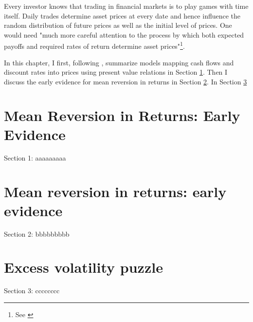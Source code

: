 \minitoc

\vspace{0.5cm}
Every investor knows that trading in financial markets is to play
games with time itself. Daily trades determine asset prices at every date and hence
influence the random distribution of future prices as well as the initial
level of prices. One would need "much more careful attention to the process
by which both expected payoffs and required rates of return determine
asset prices"\footnote{See \cite[p.~121]{campbell2017financial}}.

In this chapter, I first, following \citet[Chapter~5]{campbell2017financial}, summarize models 
mapping cash flows and discount rates into prices using present value relations in Section \ref{chap1:sec1}.
Then I discuss the early evidence for mean reversion in returns in Section \ref{chap1:sec2}.
In Section \ref{chap1:sec3}

\section{Mean Reversion in Returns: Early Evidence}\label{chap1:sec1}
Section 1: aaaaaaaaa

\section{Mean reversion in returns: early evidence}\label{chap1:sec2}
Section 2: bbbbbbbbb

\section{Excess volatility puzzle}\label{chap1:sec3}
Section 3: cccccccc